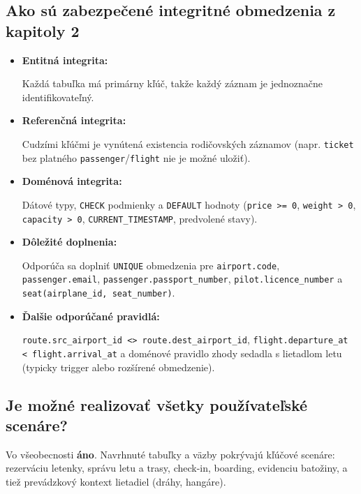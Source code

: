 \documentclass[11pt, a4paper]{article}
\begin{document}
\subsection{Ako sú zabezpečené integritné obmedzenia z kapitoly 2}

\begin{itemize}
    \item \textbf{Entitná integrita:} 
    
    Každá tabuľka má primárny kľúč, takže každý záznam je jednoznačne identifikovateľný.
    
    \item \textbf{Referenčná integrita:} 
    
    Cudzími kľúčmi je vynútená existencia rodičovských záznamov
        (napr. \texttt{ticket} bez platného \texttt{passenger}/\texttt{flight} nie je možné uložiť).
    
    \item \textbf{Doménová integrita:} 
    
    Dátové typy, \texttt{CHECK} podmienky a \texttt{DEFAULT}
        hodnoty (\texttt{price >= 0}, \texttt{weight > 0}, \texttt{capacity > 0},
        \texttt{CURRENT\_TIMESTAMP}, predvolené stavy).
    
    \item \textbf{Dôležité doplnenia:} 
    
    Odporúča sa doplniť \texttt{UNIQUE} obmedzenia pre
        \texttt{airport.code}, \texttt{passenger.email}, \texttt{passenger.passport\_number},
        \texttt{pilot.licence\_number} a \texttt{seat(airplane\_id, seat\_number)}.
    
    \item \textbf{Ďalšie odporúčané pravidlá:} 
    
    \texttt{route.src\_airport\_id <> route.dest\_airport\_id}, \texttt{flight.departure\_at < flight.arrival\_at} a doménové pravidlo zhody sedadla s lietadlom letu (typicky trigger alebo rozšírené obmedzenie).
\end{itemize}

\subsection{Je možné realizovať všetky používateľské scenáre?}

Vo všeobecnosti \textbf{áno}. Navrhnuté tabuľky a väzby pokrývajú kľúčové scenáre:
rezerváciu letenky, správu letu a trasy, check-in, boarding, evidenciu batožiny,
a tiež prevádzkový kontext lietadiel (dráhy, hangáre).
\end{document}
